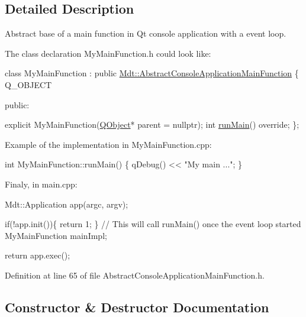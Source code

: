 \subsection{Detailed Description}
Abstract base of a main function in Qt console application with a event loop. 

The class declaration My\+Main\+Function.\+h could look like\+: 
\begin{DoxyCode}
\textcolor{keyword}{class }MyMainFunction : \textcolor{keyword}{public} \hyperlink{class_mdt_1_1_abstract_console_application_main_function}{Mdt::AbstractConsoleApplicationMainFunction}
\{
 Q\_OBJECT

 \textcolor{keyword}{public}:

  \textcolor{keyword}{explicit} MyMainFunction(\hyperlink{class_q_object}{QObject}* parent = \textcolor{keyword}{nullptr});
  \textcolor{keywordtype}{int} \hyperlink{class_mdt_1_1_abstract_console_application_main_function_a34213b6ac2188b3620f5c2f5ce4ee287}{runMain}() \textcolor{keyword}{override};
\};
\end{DoxyCode}


Example of the implementation in My\+Main\+Function.\+cpp\+: 
\begin{DoxyCode}
\textcolor{keywordtype}{int} MyMainFunction::runMain()
\{
  qDebug() << \textcolor{stringliteral}{"My main ..."};
\}
\end{DoxyCode}


Finaly, in main.\+cpp\+: 
\begin{DoxyCode}
Mdt::Application app(argc, argv);

\textcolor{keywordflow}{if}(!app.init())\{
  \textcolor{keywordflow}{return} 1;
\}
\textcolor{comment}{// This will call runMain() once the event loop started}
MyMainFunction mainImpl;

\textcolor{keywordflow}{return} app.exec();
\end{DoxyCode}
 

Definition at line 65 of file Abstract\+Console\+Application\+Main\+Function.\+h.



\subsection{Constructor \& Destructor Documentation}
